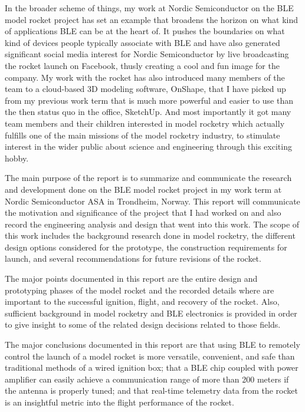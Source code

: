 \documentclass{workreport}
\begin{document}
\begin{frontmatter}
\begin{contributions}
	In the broader scheme of things, my work at Nordic Semiconductor on the BLE model rocket project has set an example that broadens the horizon on what kind of applications BLE can be at the heart of. It pushes the boundaries on what kind of devices people typically associate with BLE and have also generated significant social media interest for Nordic Semiconductor by live broadcasting the rocket launch on Facebook, thusly creating a cool and fun image for the company. My work with the rocket has also introduced many members of the team to a cloud-based 3D modeling software, OnShape, that I have picked up from my previous work term that is much more powerful and easier to use than the then status quo in the office, SketchUp. And most importantly it got many team members and their children interested in model rocketry which actually fulfills one of the main missions of the model rocketry industry, to stimulate interest in the wider public about science and engineering through this exciting hobby.

\end{contributions}

\begin{summary}

	The main purpose of the report is to summarize and communicate the research and development done on the BLE model rocket project in my work term at Nordic Semiconductor ASA in Trondheim, Norway. This report will communicate the motivation and significance of the project that I had worked on and also record the engineering analysis and design that went into this work. The scope of this work includes the background research done in model rocketry, the different design options considered for the prototype, the construction requirements for launch, and several recommendations for future revisions of the rocket.

	The major points documented in this report are the entire design and prototyping phases of the model rocket and the recorded details where are important to the successful ignition, flight, and recovery of the rocket. Also, sufficient background in model rocketry and BLE electronics is provided in order to give insight to some of the related design decisions related to those fields.

	The major conclusions documented in this report are that using BLE to remotely control the launch of a model rocket is more versatile, convenient, and safe than traditional methods of a wired ignition box; that a BLE chip coupled with power amplifier can easily achieve a communication range of more than 200 meters if the antenna is properly tuned; and that real-time telemetry data from the rocket is an insightful metric into the flight performance of the rocket.


\end{summary}
\end{frontmatter}
\end{document}
